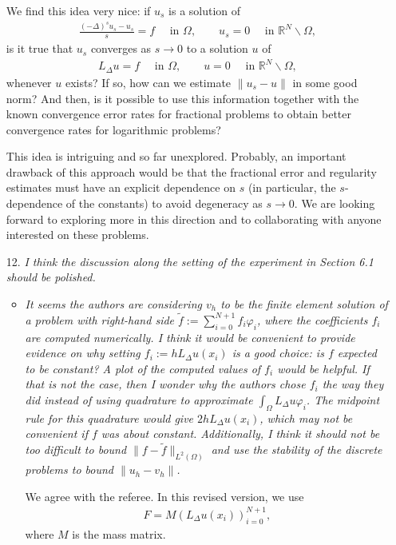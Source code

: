 \documentclass[11 pt]{article}
\numberwithin{equation}{section}
\def\tilde{\widetilde}
\def\R{\mathbb{R}}
\begin{document}
\begin{enumerate}
    We find this idea very nice: if $u_s$ is a solution of
    \begin{align*}
     \frac{(-\Delta)^s u_s - u_s}{s}=f\quad \text{ in }\Omega,\qquad u_s=0\quad \text{ in }\R^N\backslash \Omega,
    \end{align*}
 is it true that $u_s$ converges as $s\to 0$ to a solution $u$ of
  \begin{align*}
     L_\Delta u = f\quad \text{ in }\Omega,\qquad u=0\quad \text{ in }\R^N\backslash \Omega,
    \end{align*}
whenever $u$ exists?     If so, how can we estimate $\|u_s-u\|$ in some good norm?  And then, is it possible to use this information together with the known convergence error rates for fractional problems to obtain better convergence rates for logarithmic problems?

This idea is intriguing and so far unexplored.  Probably, an important drawback of this approach would be that the fractional error and regularity estimates must have an explicit dependence on $s$ (in particular, the $s$-dependence of the constants) to avoid degeneracy as $s\to 0$. We are looking forward to exploring more in this direction and to collaborating with anyone interested on these problems.

    \item[12.] \emph{I think the discussion along the setting of the experiment in Section 6.1 should be polished.}
    \begin{itemize}
        \item \emph{It seems the authors are considering \(v_{h}\) to be the finite element solution of a problem with right-hand side \(\tilde{f}:=\sum_{i=0}^{N+1}f_{i}\varphi_{i}\), where the coefficients \(f_{i}\) are computed numerically. I think it would be convenient to provide evidence on why setting \(f_{i}:=hL_{\Delta}u(x_{i})\) is a good choice: is \(f\) expected to be constant? A plot of the computed values of \(f_{i}\) would be helpful. If that is not the case, then I wonder why the authors chose \(f_{i}\) the way they did instead of using quadrature to approximate \(\int_{\Omega}L_{\Delta}u\varphi_{i}\). The midpoint rule for this quadrature would give \(2hL_{\Delta}u(x_{i})\), which may not be convenient if \(f\) was about constant. Additionally, I think it should not be too difficult to bound \(\|f-\tilde{f}\|_{L^{2}(\Omega)}\) and use the stability of the discrete problems to bound \(\|u_{h}-v_{h}\|\).}


        We agree with the referee. In this revised version, we use
\begin{align*}
 F = M  (L_\Delta u(x_i))_{i=0}^{N+1},
\end{align*}
where $M$ is the mass matrix.


\end{itemize}
\end{enumerate}
\end{document}

